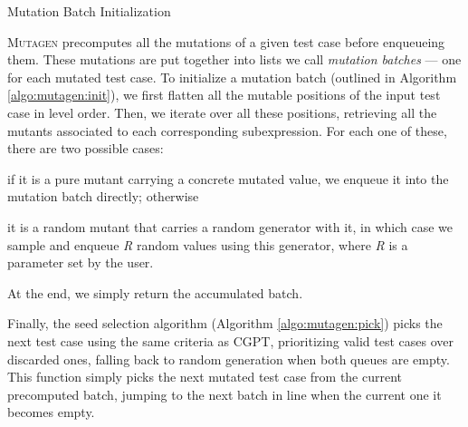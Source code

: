 \documentclass[sigconf,review,anonymous]{acmart}
\newcommand{\mutagen}{\textsc{Mutagen}\xspace}
\begin{document}
\begin{algorithm}[t]
  \SetAlgoLined
  \DontPrintSemicolon
\caption{\label{algo:mutagen:init}Mutation Batch Initialization}
\end{algorithm}



\mutagen precomputes all the mutations of a given test case before enqueueing
them.
%
These mutations are put together into lists we call \emph{mutation batches} ---
one for each mutated test case.
%
To initialize a mutation batch (outlined in Algorithm \ref{algo:mutagen:init}),
we first flatten all the mutable positions of the input test case in level order.
%
Then, we iterate over all these positions, retrieving all the mutants associated
to each corresponding subexpression.
%
For each one of these, there are two possible cases:
%
\begin{inparaenum}
\item if it is a pure mutant carrying a concrete mutated value, we enqueue it
  into the mutation batch directly; otherwise
\item it is a random mutant that carries a random generator with it, in which
  case we sample and enqueue \textit{R} random values using this generator,
  where \textit{R} is a parameter set by the user.
\end{inparaenum}
%
At the end, we simply return the accumulated batch.


Finally, the seed selection algorithm (Algorithm \ref{algo:mutagen:pick}) picks
the next test case using the same criteria as CGPT, prioritizing valid test
cases over discarded ones, falling back to random generation when both queues
are empty.
%
This function simply picks the next mutated test case from the current
precomputed batch, jumping to the next batch in line when the current one it
becomes empty.
\end{document}
